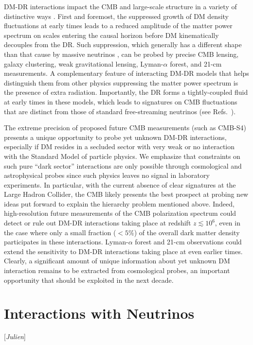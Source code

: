 \documentclass[12pt]{article}
\newcommand{\Contributors}[1]{ {\footnotesize [\textit{#1}]}}
\begin{document}
 DM-DR interactions impact the CMB and large-scale structure in a variety of distinctive ways \cite{Boehm:2001hm,Cyr-Racine:2013fsa,Cyr-Racine:2015ihg}. First and foremost, the suppressed growth of DM density fluctuations at early times leads to a reduced amplitude of the matter power spectrum on scales entering the causal horizon before DM kinematically decouples from the DR. Such suppression, which generally has a different shape than that cause by massive neutrinos \cite{Abazajian:2016yjj}, can be probed by precise CMB lensing, galaxy clustering, weak gravitational lensing, Lyman-$\alpha$ forest, and 21-cm measurements. A complementary feature of interacting DM-DR models that helps distinguish them from other physics suppressing the matter power spectrum is the presence of extra radiation. Importantly, the DR forms a tightly-coupled fluid at early times in these models, which leads to signatures on CMB fluctuations that are distinct from those of standard free-streaming neutrinos (see Refs.~\cite{Bashinsky:2003tk,Follin:2015hya,Baumann:2015rya}).
 
The extreme precision of proposed future CMB measurements (such as CMB-S4) presents a unique opportunity to probe yet unknown DM-DR interactions, especially if DM resides in a secluded sector with very weak or no interaction with the Standard Model of particle physics. We emphasize that constraints on such pure ``dark sector'' interactions are only possible through cosmological and astrophysical probes since such physics leaves no signal in laboratory experiments. In particular, with the current absence of clear signatures at the Large Hadron Collider, the CMB likely presents the best prospect at probing new ideas put forward to explain the hierarchy problem mentioned above. Indeed, high-resolution future measurements of the CMB polarization spectrum could detect or rule out DM-DR interactions taking place at redshift $z\lesssim10^6$, even in the case where only a small fraction ($<5\%$) of the overall dark matter density participates in these interactions. Lyman-$\alpha$ forest and 21-cm observations could extend the sensitivity to DM-DR interactions taking place at even earlier times. Clearly, a significant amount of unique information about yet unknown DM interaction remains to be extracted from cosmological probes, an important opportunity that should be exploited in the next decade.  

\section{Interactions with Neutrinos}
\Contributors{Julien} 
\end{document}
